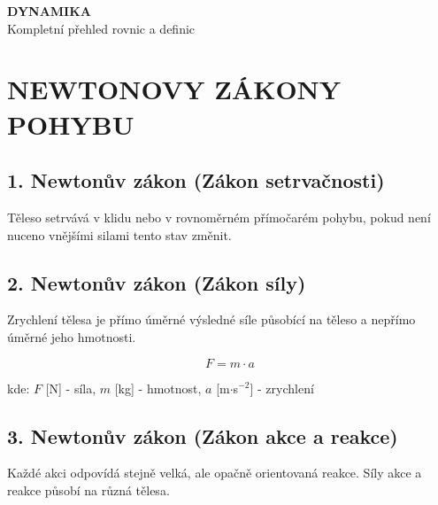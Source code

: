 \documentclass[a4paper,11pt]{article}
\begin{document}
\begin{center}
    {\Huge \textbf{DYNAMIKA}}\\[0.5cm]
    {\Large Kompletní přehled rovnic a definic}\\[1cm]
\end{center}

\section{NEWTONOVY ZÁKONY POHYBU}

\subsection{1. Newtonův zákon (Zákon setrvačnosti)}

\begin{definitionbox}
Těleso setrvává v klidu nebo v rovnoměrném přímočarém pohybu, pokud není nuceno vnějšími silami tento stav změnit.
\end{definitionbox}

\subsection{2. Newtonův zákon (Zákon síly)}

\begin{definitionbox}
Zrychlení tělesa je přímo úměrné výsledné síle působící na těleso a nepřímo úměrné jeho hmotnosti.
\end{definitionbox}

\begin{equationbox}
\begin{equation*}
    F = m \cdot a
\end{equation*}
\end{equationbox}

\begin{notebox}
kde: $F$ [N] - síla, $m$ [kg] - hmotnost, $a$ [m$\cdot$s$^{-2}$] - zrychlení
\end{notebox}

\subsection{3. Newtonův zákon (Zákon akce a reakce)}

\begin{definitionbox}
Každé akci odpovídá stejně velká, ale opačně orientovaná reakce. Síly akce a reakce působí na různá tělesa.
\end{definitionbox}
\end{document}
